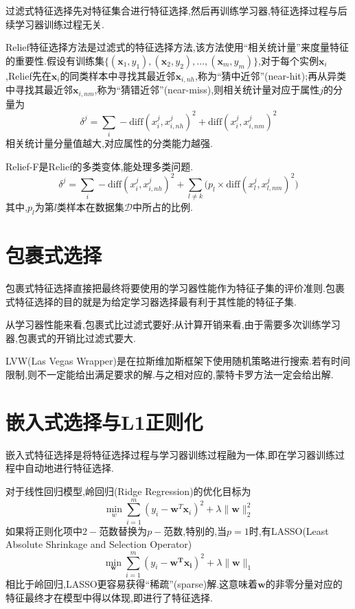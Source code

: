 过滤式特征选择先对特征集合进行特征选择,然后再训练学习器,特征选择过程与后续学习器训练过程无关.

Relief特征选择方法是过滤式的特征选择方法,该方法使用``相关统计量''来度量特征的重要性.假设有训练集$\{(\mathbf{x}_1, y_1),(\mathbf{x}_2, y_2),\dots,(\mathbf{x}_m, y_m)\}$,对于每个实例$\mathbf{x}_i$,Relief先在$\mathbf{x}_i$的同类样本中寻找其最近邻$\mathbf{x}_{i,nh}$,称为``猜中近邻''(near-hit);再从异类中寻找其最近邻$\mathbf{x}_{i,nm}$,称为``猜错近邻''(near-miss),则相关统计量对应于属性$j$的分量为
\begin{equation}
\delta^j=\sum_i-\text{diff}(x_i^j,x_{i,nh}^j)^2+\text{diff}(x_i^j,x_{i,nm}^j)^2
\end{equation}
相关统计量分量值越大,对应属性的分类能力越强.

Relief-F是Relief的多类变体,能处理多类问题.
\begin{equation}
\delta^j=\sum_i-\text{diff}(x_i^j,x_{i,nh}^j)^2+\sum_{l\ne k}\Big(p_l\times\text{diff}(x_l^j,x_{l,nm}^j)^2\Big)
\end{equation}
其中,$p_l$为第$l$类样本在数据集$\mathcal{D}$中所占的比例.

\section{包裹式选择}

包裹式特征选择直接把最终将要使用的学习器性能作为特征子集的评价准则.包裹式特征选择的目的就是为给定学习器选择最有利于其性能的特征子集.

从学习器性能来看,包裹式比过滤式要好;从计算开销来看,由于需要多次训练学习器,包裹式的开销比过滤式要大.

LVW(Las Vegas Wrapper)是在拉斯维加斯框架下使用随机策略进行搜索.若有时间限制,则不一定能给出满足要求的解.与之相对应的,蒙特卡罗方法一定会给出解.

\section{嵌入式选择与L1正则化}

嵌入式特征选择是将特征选择过程与学习器训练过程融为一体,即在学习器训练过程中自动地进行特征选择.

对于线性回归模型,岭回归(Ridge Regression)的优化目标为
\begin{equation}
\min_{w}\sum_{i=1}^m(y_i-\mathbf{w}^T\mathbf{x}_i)^2+\lambda\|\mathbf{w}\|_2^2
\end{equation}
如果将正则化项中$2-$范数替换为$p-$范数,特别的,当$p=1$时,有LASSO(Least Absolute Shrinkage and Selection Operator)
\begin{equation}
\min_{\mathbf{w}}\sum_{i=1}^m(y_i-\mathbf{w^Tx_i})^2+\lambda\|\mathbf{w}\|_1
\end{equation}
相比于岭回归,LASSO更容易获得``稀疏''(sparse)解.这意味着$\mathbf{w}$的非零分量对应的特征最终才在模型中得以体现,即进行了特征选择.

